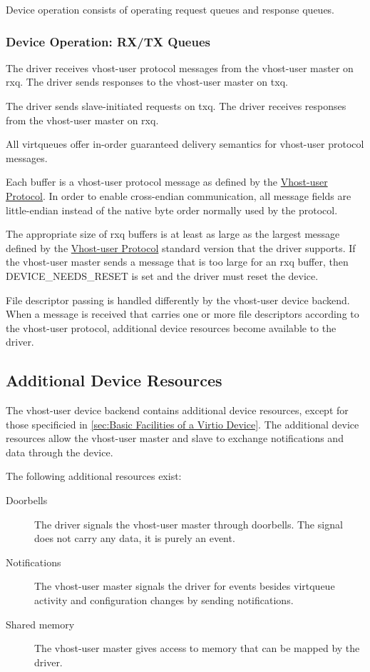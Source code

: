 Device operation consists of operating request queues and response queues.

\subsubsection{Device Operation: RX/TX Queues}\label{sec:Device Types / Vhost-user Device Backend / Device Operation / Device Operation: RX/TX Queues}

The driver receives vhost-user protocol messages from the vhost-user master on
rxq.  The driver sends responses to the vhost-user master on txq.

The driver sends slave-initiated requests on txq.  The driver receives
responses from the vhost-user master on rxq.

All virtqueues offer in-order guaranteed delivery semantics for vhost-user
protocol messages.

Each buffer is a vhost-user protocol message as defined by the
\hyperref[intro:Vhost-user Protocol]{Vhost-user Protocol}.  In order to enable
cross-endian communication, all message fields are little-endian instead of the
native byte order normally used by the protocol.

The appropriate size of rxq buffers is at least as large as the largest message
defined by the \hyperref[intro:Vhost-user Protocol]{Vhost-user Protocol}
standard version that the driver supports.  If the vhost-user master sends a
message that is too large for an rxq buffer, then DEVICE_NEEDS_RESET is set and
the driver must reset the device.

File descriptor passing is handled differently by the vhost-user device
backend.  When a message is received that carries one or more file descriptors
according to the vhost-user protocol, additional device resources become
available to the driver.

\subsection{Additional Device Resources}\label{sec:Device Types / Vhost-user Device Backend / Additional Device Resources}

The vhost-user device backend contains additional device resources, except for
those specificied in \ref{sec:Basic Facilities of a Virtio Device}. The
additional device resources allow the vhost-user master and slave to exchange
notifications and data through the device.

The following additional resources exist:
\begin{description}
  \item[Doorbells] The driver signals the vhost-user master through doorbells.  The signal does not carry any data, it is purely an event.
  \item[Notifications] The vhost-user master signals the driver for events besides virtqueue activity and configuration changes by sending notifications.
  \item[Shared memory] The vhost-user master gives access to memory that can be mapped by the driver.
\end{description}

